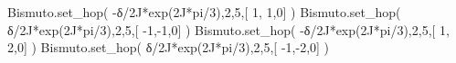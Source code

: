 \documentclass[
  letterpaper,
  DIV=11,
  numbers=noendperiod]{scrreprt}
\newenvironment{Shaded}{\begin{snugshade}}{\end{snugshade}}
\newcommand{\DecValTok}[1]{\textcolor[rgb]{0.68,0.00,0.00}{#1}}
\newcommand{\NormalTok}[1]{\textcolor[rgb]{0.00,0.23,0.31}{#1}}
\newcommand{\OperatorTok}[1]{\textcolor[rgb]{0.37,0.37,0.37}{#1}}
\newcommand{\OtherTok}[1]{\textcolor[rgb]{0.00,0.23,0.31}{#1}}
\begin{document}
\begin{Shaded}
\begin{Highlighting}[]
\NormalTok{Bismuto.set\_hop(  }\OperatorTok{{-}}\NormalTok{δ}\OperatorTok{/}\OtherTok{2J}\OperatorTok{*}\NormalTok{exp(}\OtherTok{2J}\OperatorTok{*}\NormalTok{pi}\OperatorTok{/}\DecValTok{3}\NormalTok{),}\DecValTok{2}\NormalTok{,}\DecValTok{5}\NormalTok{,[  }\DecValTok{1}\NormalTok{, }\DecValTok{1}\NormalTok{,}\DecValTok{0}\NormalTok{] ) }
\NormalTok{Bismuto.set\_hop(   δ}\OperatorTok{/}\OtherTok{2J}\OperatorTok{*}\NormalTok{exp(}\OtherTok{2J}\OperatorTok{*}\NormalTok{pi}\OperatorTok{/}\DecValTok{3}\NormalTok{),}\DecValTok{2}\NormalTok{,}\DecValTok{5}\NormalTok{,[ }\OperatorTok{{-}}\DecValTok{1}\NormalTok{,}\OperatorTok{{-}}\DecValTok{1}\NormalTok{,}\DecValTok{0}\NormalTok{] )}
\NormalTok{Bismuto.set\_hop(  }\OperatorTok{{-}}\NormalTok{δ}\OperatorTok{/}\OtherTok{2J}\OperatorTok{*}\NormalTok{exp(}\OtherTok{2J}\OperatorTok{*}\NormalTok{pi}\OperatorTok{/}\DecValTok{3}\NormalTok{),}\DecValTok{2}\NormalTok{,}\DecValTok{5}\NormalTok{,[  }\DecValTok{1}\NormalTok{, }\DecValTok{2}\NormalTok{,}\DecValTok{0}\NormalTok{] )}
\NormalTok{Bismuto.set\_hop(   δ}\OperatorTok{/}\OtherTok{2J}\OperatorTok{*}\NormalTok{exp(}\OtherTok{2J}\OperatorTok{*}\NormalTok{pi}\OperatorTok{/}\DecValTok{3}\NormalTok{),}\DecValTok{2}\NormalTok{,}\DecValTok{5}\NormalTok{,[ }\OperatorTok{{-}}\DecValTok{1}\NormalTok{,}\OperatorTok{{-}}\DecValTok{2}\NormalTok{,}\DecValTok{0}\NormalTok{] )}
\end{Highlighting}
\end{Shaded}
\end{document}
